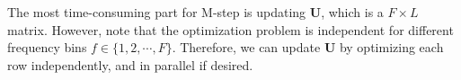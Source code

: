 \documentclass{article} %
\begin{document}
The most time-consuming part for M-step is updating $\mathbf{U}$,
which is a $F\times L$ matrix. However, note that the optimization
problem is independent for different frequency bins $f\in \{1, 2,
\cdots, F\}$. Therefore, we can update $\mathbf{U}$ by optimizing each
row independently, and in parallel if desired.

%
%      
%
%
\end{document}
